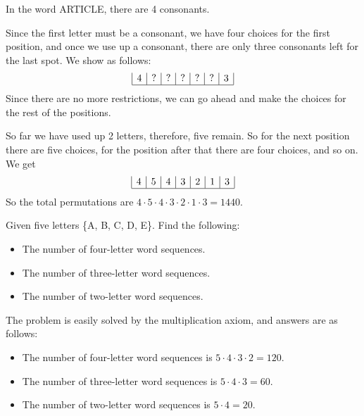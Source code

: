 \begin{solution}
    In the word ARTICLE, there are 4 consonants.

    Since the first letter must be a consonant, we have four choices for the first position, and once we use up a consonant, there are only three consonants left for the last spot. We show as follows:
    \[
        \begin{array}{|c|c|c|c|c|c|c|}
            4 & ? & ? & ? & ? & ? & 3 \\
            \hline
        \end{array}
    \]
    Since there are no more restrictions, we can go ahead and make the choices for the rest of the positions.

    So far we have used up 2 letters, therefore, five remain. So for the next position there are five choices, for the position after that there are four choices, and so on. We get
    \[
        \begin{array}{|c|c|c|c|c|c|c|}
            4 & 5 & 4 & 3 & 2 & 1 & 3 \\
            \hline
        \end{array}
    \]
    So the total permutations are \( 4 \cdot 5 \cdot 4 \cdot 3 \cdot 2 \cdot 1 \cdot 3 = 1440 \).
\end{solution}

\begin{example}
    Given five letters \{A, B, C, D, E\}. Find the following:
    \begin{itemize}
        \item The number of four-letter word sequences.
        \item The number of three-letter word sequences.
        \item The number of two-letter word sequences.
    \end{itemize}
\end{example}

\begin{solution}
    The problem is easily solved by the multiplication axiom, and answers are as follows:
    \begin{itemize}
        \item The number of four-letter word sequences is \( 5 \cdot 4 \cdot 3 \cdot 2 = 120 \).
        \item The number of three-letter word sequences is \( 5 \cdot 4 \cdot 3 = 60 \).
        \item The number of two-letter word sequences is \( 5 \cdot 4 = 20 \).
    \end{itemize}
\end{solution}

